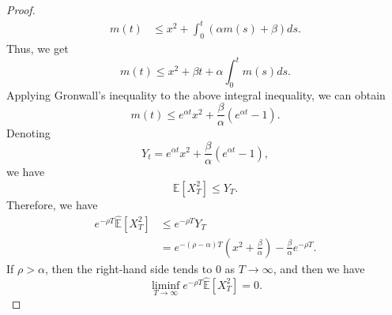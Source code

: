 \documentclass[onecolumn, journal]{IEEEtran} %
\begin{document}
\begin{proof}
\begin{align*}
			m(t) &\leq x^2 + \int_0^t (\alpha m(s) + \beta)  ds.
		\end{align*}
		Thus, we get
		\[
		m(t) \leq x^2 + \beta t + \alpha \int_0^t m(s)  ds.
		\]
		Applying Gronwall's inequality to the above integral inequality, we can obtain
		\[
		m(t) \leq e^{\alpha t} x^{2} + \frac{\beta}{\alpha} (e^{\alpha t} - 1).
		\]
		Denoting
		\begin{equation*}
			Y_t = e^{\alpha t} x^2 + \frac{\beta}{\alpha}(e^{\alpha t} - 1)\label{A.2}\tag{A.2},
		\end{equation*}
		we have
		\[
		\hat{\mathbb{E}}[X_T^2] \leq Y_T.
		\]
		Therefore, we have
		\[
		\begin{aligned}
			e^{-\rho T} \hat{\mathbb{E}}[X_T^2] 
			& \leq e^{-\rho T} Y_T \\
			& = e^{-(\rho - \alpha)T} \left(x^2 + \frac{\beta}{\alpha}\right) - \frac{\beta}{\alpha} e^{-\rho T}.
		\end{aligned}
		\]
		If $\rho > \alpha$, then the right-hand side tends to 0 as $T \to \infty$, and then we have
		\[
		\liminf_{T \to \infty} e^{-\rho T} \hat{\mathbb{E}}[X_T^2] = 0.
		\]
		

\end{proof}
\end{document}
